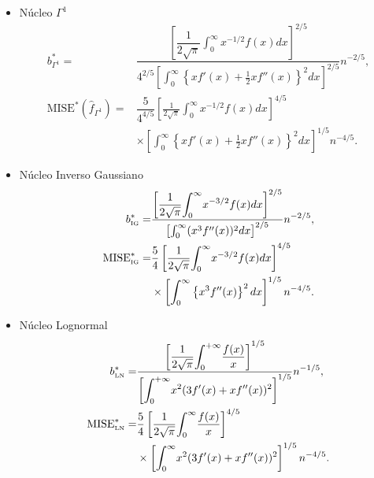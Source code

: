 \begin{itemize}
	\item Núcleo $\Gamma^1$
	\begin{align}
	\label{MISEoptGamma}
	b^*_{\Gamma^1}=&\dfrac{\left[\dfrac{1}{2\sqrt{\pi}} \displaystyle{\int_{0}^{\infty}} x^{-1/2}f(x)dx \right]^{2/5}}
	{4^{2/5} \left[\displaystyle{\int_{0}^{\infty}} \left\{x f'(x) +\frac{1}{2} x f''(x)\right\}^2 dx \right]^{2/5}} n^{-2/5},\\
	\nonumber \text{MISE}^*(\widehat{f}_{\Gamma^1})=&\dfrac{5}{4^{4/5}} \left[\frac{1}{2\sqrt{\pi}} \int_{0}^{\infty} x^{-1/2}f(x)dx \right]^{4/5} \\
	&\times \left[\int_{0}^{\infty}  \left\{x f'(x) +\frac{1}{2} x f''(x)\right\}^2 dx \right]^{1/5} n^{-4/5}. 
	\end{align}
	\item Núcleo Inverso Gaussiano
	\begin{align}
	\label{MISEoptIG}
	b^*_{\text{\tiny{IG}}}=&\dfrac{\left[\dfrac{1}{2\sqrt{\pi}} \displaystyle{\int_{0}^{\infty}} x^{-3/2}f(x)dx \right]^{2/5}}
	{ \left[\int_{0}^{\infty}(x^3 f''(x))^2 dx \right]^{2/5}} n^{-2/5},\\
	\nonumber \text{MISE}^*_{\text{\tiny{IG}}}=&\dfrac{5}{4} \left[\frac{1}{2\sqrt{\pi}} \displaystyle{\int_{0}^{\infty}} x^{-3/2}f(x)dx \right]^{4/5} \\
	&\times \left[\displaystyle{\int_{0}^{\infty}}  \left\{x^3 f''(x) \right\}^2 dx \right]^{1/5} n^{-4/5} .
	\end{align}
	\item Núcleo Lognormal
	\begin{align}
	\label{MISEoptLN}
	b^*_{\text{\tiny{LN}}}=&\dfrac{\left[\dfrac{1}{2\sqrt{\pi}}\displaystyle{\int_0^{+\infty}}\frac{f(x)}{x}\right]^{1/5}}{\left[\displaystyle{\int_0^{+\infty}} x^2(3f'(x)+xf''(x))^2\right]^{1/5}}n^{-1/5},\\
	\nonumber \text{MISE}^*_{\text{\tiny{LN}}}=&\dfrac{5}{4}  \left[\dfrac{1}{2\sqrt{\pi}}\displaystyle{\int_{0}^{\infty}} \frac{f(x)}{x} \right]^{4/5} \\
	&\times \left[\displaystyle{\int_{0}^{\infty}}  x^2 (3 f'(x) + x f''(x))^2 \right]^{1/5} n^{-4/5}.
	\end{align}
\end{itemize}

